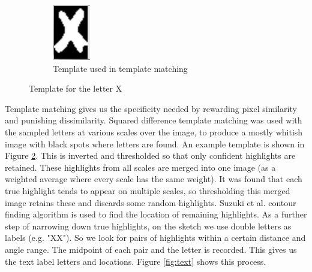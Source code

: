 \documentclass[conference]{IEEEtran}
\begin{document}
\begin{figure}[h]
\begin{subfigure}[b]{0.15\textwidth}
         \includegraphics[width=\textwidth]{tem3}
         \caption{Template used in template matching}
         \label{fig:tem3}
     \end{subfigure}
     \hfill
        \caption{Template for the letter X}
        \label{fig:tem}
\end{figure}

Template matching gives us the specificity needed by rewarding pixel similarity and punishing dissimilarity. Squared difference template matching was used with the sampled letters at various scales over the image, to produce a mostly whitish image with black spots where letters are found. An example template is shown in Figure \ref{fig:tem}. This is inverted and thresholded so that only confident highlights are retained. These highlights from all scales are merged into one image (as a weighted average where every scale has the same weight). It was found that each true highlight tends to appear on multiple scales, so thresholding this merged image retains these and discards some random highlights. Suzuki et al. \cite{suzuki1985topological} contour finding algorithm is used to find the location of remaining highlights. As a further step of narrowing down true highlights, on the sketch we use double letters as labels (e.g. "XX"). So we look for pairs of highlights within a certain distance and angle range. The midpoint of each pair and the letter is recorded. This gives us the text label letters and locations. Figure \ref{fig:text} shows this process.
\end{document}
